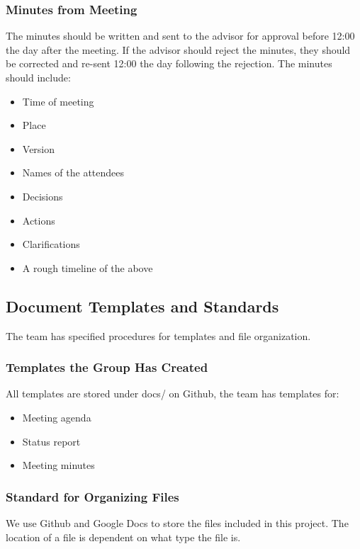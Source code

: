 \subsubsection{Minutes from Meeting}
The minutes should be written and sent to the advisor for approval before 12:00 the day after the meeting. If the advisor should reject the minutes, they should be corrected and re-sent 12:00 the day following the rejection. The minutes should include:
\begin{itemize}
	\item Time of meeting
	\item Place
	\item Version
	\item Names of the attendees
	\item Decisions
	\item Actions
	\item Clarifications
	\item A rough timeline of the above
\end{itemize}

\subsection{Document Templates and Standards}
The team has specified procedures for templates and file organization.

\subsubsection{Templates the Group Has Created}
All templates are stored under docs/ on Github, the team has templates for:

\begin{itemize}
	\item Meeting agenda
	\item Status report
	\item Meeting minutes
\end{itemize}

\subsubsection{Standard for Organizing Files}
We use Github and Google Docs to store the files included in this project. The
location of a file is dependent on what type the file is. 

